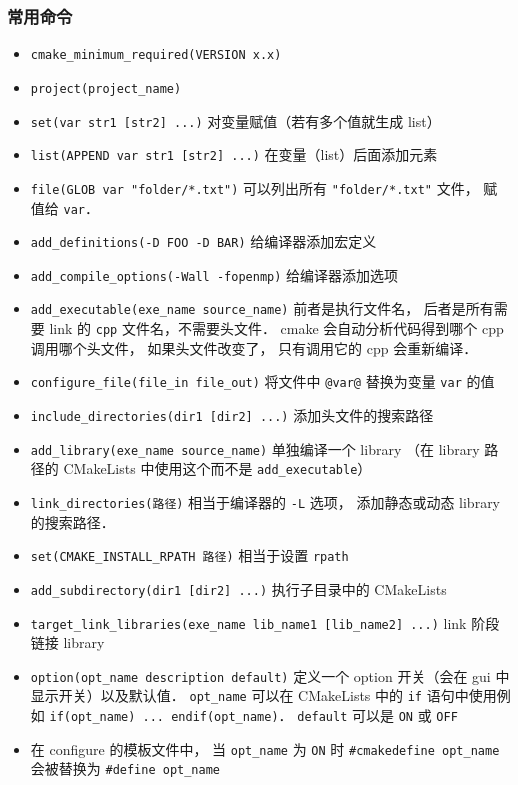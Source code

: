 \subsubsection{常用命令}
\begin{itemize}
\item \verb`cmake_minimum_required(VERSION x.x)`
\item \verb`project(project_name)`
\item \verb`set(var str1 [str2] ...)` 对变量赋值（若有多个值就生成 list）
\item \verb`list(APPEND var str1 [str2] ...)` 在变量（list）后面添加元素
\item \verb`file(GLOB var "folder/*.txt")` 可以列出所有 \verb|"folder/*.txt"| 文件， 赋值给 \verb|var|．
\item \verb|add_definitions(-D FOO -D BAR)| 给编译器添加宏定义
\item \verb|add_compile_options(-Wall -fopenmp)| 给编译器添加选项
\item \verb`add_executable(exe_name source_name)` 前者是执行文件名， 后者是所有需要 link 的 \verb|cpp| 文件名，不需要头文件． cmake 会自动分析代码得到哪个 cpp 调用哪个头文件， 如果头文件改变了， 只有调用它的 cpp 会重新编译．
\item \verb`configure_file(file_in file_out)` 将文件中 \verb`@var@` 替换为变量 \verb`var` 的值
\item \verb`include_directories(dir1 [dir2] ...)` 添加头文件的搜索路径
\item \verb`add_library(exe_name source_name)` 单独编译一个 library （在 library 路径的 CMakeLists 中使用这个而不是 \verb`add_executable`）
\item \verb|link_directories(路径)| 相当于编译器的 \verb`-L` 选项， 添加静态或动态 library 的搜索路径．
\item \verb|set(CMAKE_INSTALL_RPATH 路径)| 相当于设置 \verb|rpath|
\item \verb`add_subdirectory(dir1 [dir2] ...)` 执行子目录中的 CMakeLists
\item \verb`target_link_libraries(exe_name lib_name1 [lib_name2] ...)` link 阶段链接 library
\item \verb`option(opt_name description default)` 定义一个 option 开关（会在 gui 中显示开关）以及默认值． \verb`opt_name` 可以在 CMakeLists 中的 \verb`if` 语句中使用例如 \verb`if(opt_name) ... endif(opt_name)`． \verb`default` 可以是 \verb`ON` 或 \verb`OFF`
\item 在 configure 的模板文件中， 当 \verb`opt_name` 为 \verb`ON` 时 \verb`#cmakedefine opt_name` 会被替换为 \verb`#define opt_name`
\end{itemize}

